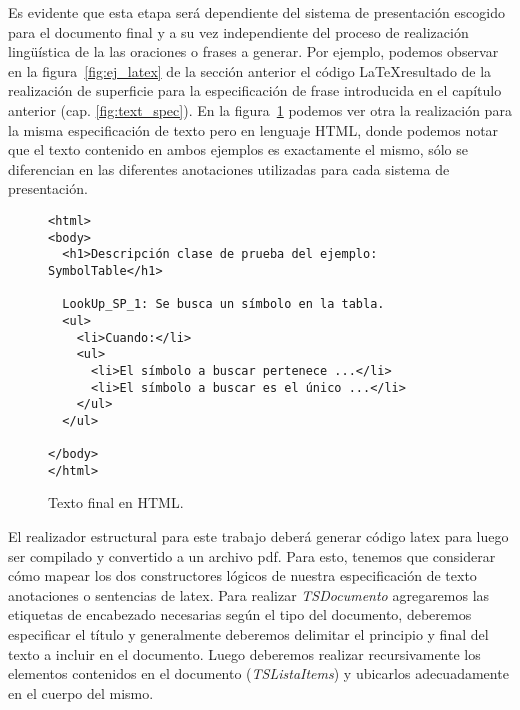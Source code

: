 Es evidente que esta etapa será dependiente del sistema de presentación escogido para el documento final y a su vez independiente del proceso de realización lingüística de la las oraciones o frases a generar.  Por ejemplo, podemos observar en la figura~\ref{fig:ej_latex} de la sección anterior el código \LaTeX resultado de la realización de superficie para la especificación de frase introducida en el capítulo anterior (cap. \ref{fig:text_spec}). En la figura~\ref{fig:ej_html} podemos ver otra la realización para la misma especificación de texto pero en lenguaje HTML, donde podemos notar que el texto contenido en ambos ejemplos es exactamente el mismo, sólo se diferencian en las diferentes anotaciones utilizadas para cada sistema de presentación.

\begin{figure}[H]
  \begin{verbatim}
<html>
<body>
  <h1>Descripción clase de prueba del ejemplo: SymbolTable</h1>

  LookUp_SP_1: Se busca un símbolo en la tabla.  
  <ul>
    <li>Cuando:</li>
    <ul>
      <li>El símbolo a buscar pertenece ...</li>
      <li>El símbolo a buscar es el único ...</li>
    </ul>
  </ul>

</body>
</html>
  \end{verbatim}
  \caption{Texto final en HTML.}
  \label{fig:ej_html}
\end{figure}

El realizador estructural para este trabajo deberá generar código latex para luego ser compilado y convertido a un archivo pdf. Para esto, tenemos que considerar cómo mapear los dos constructores lógicos de nuestra especificación de texto anotaciones o sentencias de latex. Para realizar \emph{TSDocumento} agregaremos las etiquetas de encabezado necesarias según el tipo del documento, deberemos especificar el título y generalmente deberemos delimitar el principio y final del texto a incluir en el documento. Luego deberemos realizar recursivamente los elementos contenidos en el documento (\emph{TSListaItems}) y ubicarlos adecuadamente en el cuerpo del mismo.

